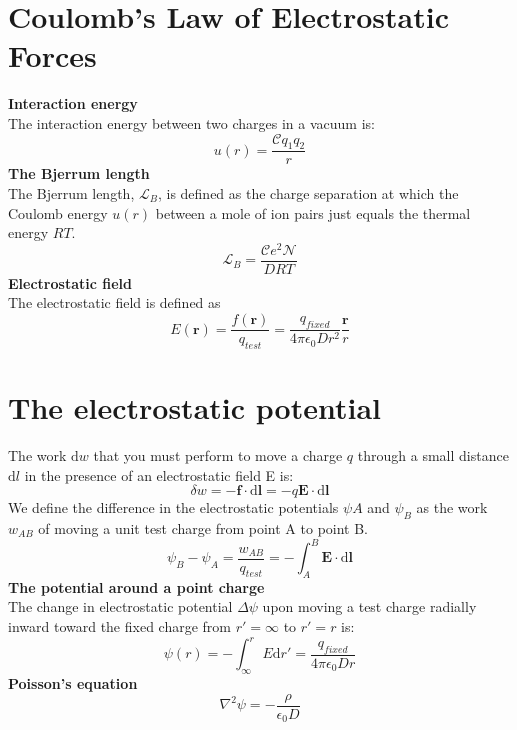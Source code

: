 \documentclass[8pt]{article}
\numberwithin{equation}{section}
\begin{document}
\begin{multicols}{2}
\section{Coulomb's Law of Electrostatic Forces}
\textbf{Interaction energy}\\
The interaction energy between two charges in a vacuum is: 
\begin{equation}
u(r)=\frac{\mathscr{C}q_{1}q_{2}}{r}
\end{equation}
\textbf{The Bjerrum length}\\
The Bjerrum length, $\mathscr{L}_{B}$, is defined as the charge separation at which the Coulomb energy $u(r)$ between a mole of ion pairs just equals the thermal energy $RT$. 
\begin{equation}
\mathscr{L}_{B}=\frac{\mathscr{C}e^{2}\mathscr{N}}{DRT} \tag{20.8}
\end{equation}
\textbf{Electrostatic field}\\
The electrostatic field is defined as 
\begin{equation}
E(\textbf{r})=\frac{f(\textbf{r})}{q_{test}}=\frac{q_{fixed}}{4\pi \epsilon_{0}Dr^{2}}\frac{\textbf{r}}{r} \tag{20.13}
\end{equation}
\section{The electrostatic potential}
The work $\mathrm{d}w$ that you must perform to move a charge $q$ through a small distance $\mathrm{d}l$ in the presence of an electrostatic field E is: 
\begin{equation}
\delta w=-\textbf{f}\cdot \mathrm{d}\textbf{l}=-q\textbf{E}\cdot \mathrm{d}\textbf{l} \tag{21.1}
\end{equation}
We define the difference in the electrostatic potentials $\psi{A}$ and $\psi_{B}$ as the work $w_{AB}$ of moving a unit test charge from point A to point B. 
\begin{equation}
\psi_{B}-\psi_{A}=\frac{w_{AB}}{q_{test}}=-\int_{A}^{B}\textbf{E}\cdot\mathrm{d}\textbf{l} \tag{21.3}
\end{equation}
\textbf{The potential around a point charge}\\
The change in electrostatic potential $\Delta\psi$ upon moving a test charge radially inward toward the fixed charge from $r'=\infty$ to $r'=r$ is: 
\begin{equation}
\psi (r)=-\int_{\infty}^{r}E\mathrm{d}r'=\frac{q_{fixed}}{4\pi \epsilon_{0}Dr} \tag{21.9}
\end{equation}
\textbf{Poisson's equation}
\begin{equation}
\nabla^{2}\psi=-\frac{\rho}{\epsilon_{0}D} \tag{21.36}
\end{equation}

\end{multicols}
\end{document}
